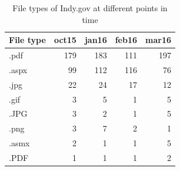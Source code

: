 \documentclass[11pt]{article}
\begin{document}
\begin{table}[ht]
\centering
\begin{tabular}{lrrrr}
  \hline
File type & oct15 & jan16 & feb16 & mar16 \\ 
  \hline
.pdf & 179 & 183 & 111 & 197 \\ 
  .aspx &  99 & 112 & 116 &  76 \\ 
  .jpg &  22 &  24 &  17 &  12 \\ 
  .gif &   3 &   5 &   1 &   5 \\ 
  .JPG &   3 &   2 &   1 &   5 \\ 
  .png &   3 &   7 &   2 &   1 \\ 
  .asmx &   2 &   1 &   1 &   5 \\ 
  .PDF &   1 &   1 &   1 &   2 \\ 
   \hline
\end{tabular}
\caption{File types of Indy.gov at different points in time} 
\end{table}

\newpage



\end{document}
